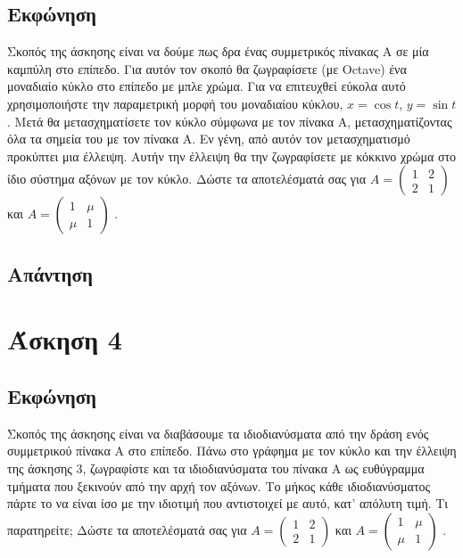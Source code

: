 \documentclass[a4paper,12pt]{article}
\begin{document}
\subsection{Εκφώνηση}
Σκοπός της άσκησης είναι να δούμε πως δρα ένας συμμετρικός πίνακας Α σε μία καμπύλη στο επίπεδο.
Για αυτόν τον σκοπό θα ζωγραφίσετε (με Octave) ένα μοναδιαίο κύκλο στο επίπεδο με μπλε χρώμα.
Για να επιτευχθεί εύκολα αυτό χρησιμοποιήστε την παραμετρική μορφή του μοναδιαίου κύκλου, $x=\cos{t}$,
$y=\sin{t}$. Μετά θα μετασχηματίσετε τον κύκλο σύμφωνα με τον πίνακα Α, μετασχηματίζοντας όλα τα σημεία
του με τον πίνακα Α. Εν γένη, από αυτόν τον μετασχηματισμό προκύπτει μια έλλειψη. Αυτήν την έλλειψη θα την
ζωγραφίσετε με κόκκινο χρώμα στο ίδιο σύστημα αξόνων με τον κύκλο. Δώστε τα αποτελέσματά σας για
$
    A=\begin{pmatrix}
        1 & 2 \\
        2 & 1
    \end{pmatrix}
$
και
$
    A=\begin{pmatrix}
        1   & \mu \\
        \mu & 1
    \end{pmatrix}
$
.
\subsection{Απάντηση}
\newpage\section{Άσκηση 4}
\subsection{Εκφώνηση}
Σκοπός της άσκησης είναι να διαβάσουμε τα ιδιοδιανύσματα από την δράση ενός συμμετρικού πίνακα Α στο
επίπεδο. Πάνω στο γράφημα με τον κύκλο και την έλλειψη της άσκησης 3, ζωγραφίστε και τα ιδιοδιανύσματα
του πίνακα Α ως ευθύγραμμα τμήματα που ξεκινούν από την αρχή τον αξόνων. Το μήκος κάθε ιδιοδιανύσματος
πάρτε το να είναι ίσο με την ιδιοτιμή που αντιστοιχεί με αυτό, κατ' απόλυτη τιμή. Τι παρατηρείτε; Δώστε
τα αποτελέσματά σας για
$
    A=\begin{pmatrix}
        1 & 2 \\
        2 & 1
    \end{pmatrix}
$
και
$
    A=\begin{pmatrix}
        1   & \mu \\
        \mu & 1
    \end{pmatrix}
$
.
\end{document}
